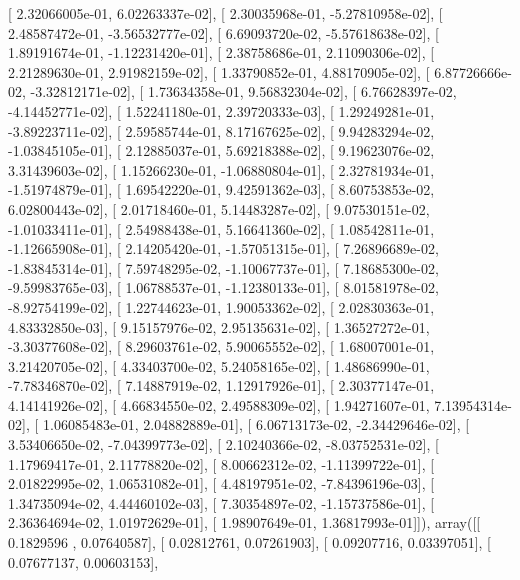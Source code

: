 \documentclass{article}
\begin{document}
       [  2.32066005e-01,   6.02263337e-02],
       [  2.30035968e-01,  -5.27810958e-02],
       [  2.48587472e-01,  -3.56532777e-02],
       [  6.69093720e-02,  -5.57618638e-02],
       [  1.89191674e-01,  -1.12231420e-01],
       [  2.38758686e-01,   2.11090306e-02],
       [  2.21289630e-01,   2.91982159e-02],
       [  1.33790852e-01,   4.88170905e-02],
       [  6.87726666e-02,  -3.32812171e-02],
       [  1.73634358e-01,   9.56832304e-02],
       [  6.76628397e-02,  -4.14452771e-02],
       [  1.52241180e-01,   2.39720333e-03],
       [  1.29249281e-01,  -3.89223711e-02],
       [  2.59585744e-01,   8.17167625e-02],
       [  9.94283294e-02,  -1.03845105e-01],
       [  2.12885037e-01,   5.69218388e-02],
       [  9.19623076e-02,   3.31439603e-02],
       [  1.15266230e-01,  -1.06880804e-01],
       [  2.32781934e-01,  -1.51974879e-01],
       [  1.69542220e-01,   9.42591362e-03],
       [  8.60753853e-02,   6.02800443e-02],
       [  2.01718460e-01,   5.14483287e-02],
       [  9.07530151e-02,  -1.01033411e-01],
       [  2.54988438e-01,   5.16641360e-02],
       [  1.08542811e-01,  -1.12665908e-01],
       [  2.14205420e-01,  -1.57051315e-01],
       [  7.26896689e-02,  -1.83845314e-01],
       [  7.59748295e-02,  -1.10067737e-01],
       [  7.18685300e-02,  -9.59983765e-03],
       [  1.06788537e-01,  -1.12380133e-01],
       [  8.01581978e-02,  -8.92754199e-02],
       [  1.22744623e-01,   1.90053362e-02],
       [  2.02830363e-01,   4.83332850e-03],
       [  9.15157976e-02,   2.95135631e-02],
       [  1.36527272e-01,  -3.30377608e-02],
       [  8.29603761e-02,   5.90065552e-02],
       [  1.68007001e-01,   3.21420705e-02],
       [  4.33403700e-02,   5.24058165e-02],
       [  1.48686990e-01,  -7.78346870e-02],
       [  7.14887919e-02,   1.12917926e-01],
       [  2.30377147e-01,   4.14141926e-02],
       [  4.66834550e-02,   2.49588309e-02],
       [  1.94271607e-01,   7.13954314e-02],
       [  1.06085483e-01,   2.04882889e-01],
       [  6.06713173e-02,  -2.34429646e-02],
       [  3.53406650e-02,  -7.04399773e-02],
       [  2.10240366e-02,  -8.03752531e-02],
       [  1.17969417e-01,   2.11778820e-02],
       [  8.00662312e-02,  -1.11399722e-01],
       [  2.01822995e-02,   1.06531082e-01],
       [  4.48197951e-02,  -7.84396196e-03],
       [  1.34735094e-02,   4.44460102e-03],
       [  7.30354897e-02,  -1.15737586e-01],
       [  2.36364694e-02,   1.01972629e-01],
       [  1.98907649e-01,   1.36817993e-01]]), array([[ 0.1829596 ,  0.07640587],
       [ 0.02812761,  0.07261903],
       [ 0.09207716,  0.03397051],
       [ 0.07677137,  0.00603153],
\end{document}
